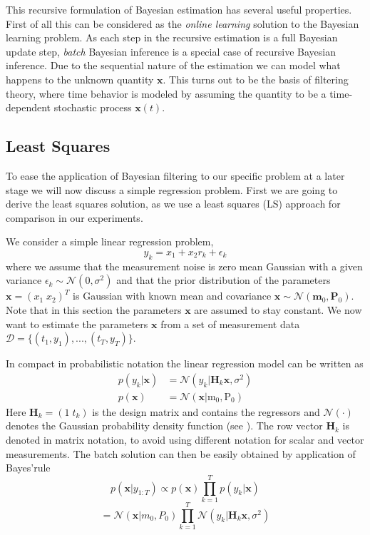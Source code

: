 This recursive formulation of Bayesian estimation has several useful
properties. First of all this can be considered as the
\textit{online learning} solution to the Bayesian learning problem.
As each step in the recursive estimation is a full Bayesian update step,
\textit{batch} Bayesian inference is a special case of recursive Bayesian
inference. Due to the sequential nature of the estimation we can model
what happens to the unknown quantity $\mathbf{x}$. This turns out
to be the basis of filtering theory, where time behavior is modeled
by assuming the quantity to be a time-dependent stochastic process
$\mathbf{x}(t)$.

\subsection{Least Squares}
To ease the application of Bayesian filtering to our specific problem
at a later stage we will now discuss a simple regression problem.
First we are going to derive the least squares solution, as
we use a least squares (LS) approach for comparison in our experiments.

We consider a simple linear regression problem,
\begin{equation}
  \label{regression_problem}
  y_k = x_1 + x_2 r_k + \epsilon_k
\end{equation}
where we assume that the measurement noise is zero mean Gaussian with
a given variance $\epsilon_k \sim \mathcal{N}(0, \sigma^2)$ and that the
prior distribution of the
parameters $\mathbf{x} = (x_{1} \; x_{2})^T$ is
Gaussian with known mean and covariance
$\mathbf{x} \sim \mathcal{N}(\mathbf{m}_0, \mathbf{P}_0)$. Note that
in this section the parameters $\mathbf{x}$ are assumed to stay constant.
We now want to estimate
the parameters $\mathbf{x}$ from a set of measurement
data $\mathcal{D} = \{(t_1, y_1),...,(t_T, y_T)\}$.

In compact in probabilistic notation the linear regression model
can be written as
\begin{equation}
  \label{regression_model_1}
  \begin{aligned}
    p(y_k | \mathbf{x}) &= \mathcal{N}(y_k | \mathbf{H}_k \mathbf{x}, \sigma^2) \\
    p(\mathbf{x}) &= \mathcal{N}(\mathbf{x} | \text{m}_0, \text{P}_0)
  \end{aligned}
\end{equation}
Here $\mathbf{H}_k = (1 \;t_k)$ is the design matrix and
contains the regressors and $\mathcal{N}(\cdot)$ denotes
the Gaussian probability density
function (see ). The row vector $\mathbf{H}_k$ is denoted
in matrix notation, to avoid using different notation for scalar
and vector measurements.
The batch solution can then be easily obtained by application of Bayes'rule
$$ p(\mathbf{x} | y_{1:T})
\propto p(\mathbf{x}) \prod^T_{k=1} p (y_k | \mathbf{x}) $$
$$ = \mathcal{N}(\mathbf{x} | m_0, P_0)
\prod^T_{k=1} \mathcal{N}(y_k | \textbf{H}_k \mathbf{x}, \sigma^2) $$

